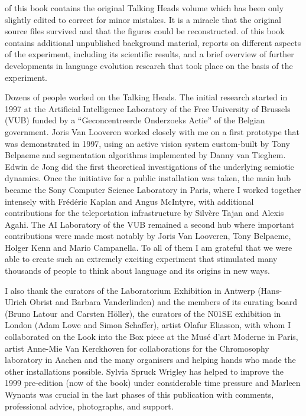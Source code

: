  of this book contains the original Talking Heads volume which has been only 
slightly edited to correct for minor mistakes. It is a miracle that the original source files survived and that the 
figures could be reconstructed.  of this book contains additional unpublished background 
material, reports on different aspects of the experiment, including its scientific results, and 
a brief overview of further developments in language evolution research that took place on the basis of the experiment. 

Dozens of people worked on the Talking Heads. The initial research started in 1997 at the Artificial Intelligence 
Laboratory of the Free University of Brussels (VUB) funded by a ``Geconcentreerde Onderzoeks Actie''
of the Belgian government. Joris Van Looveren worked closely with me on a first prototype 
that was demonstrated in 1997, using an active vision system custom-built by Tony Belpaeme and segmentation 
algorithms implemented by Danny van Tieghem. Edwin de Jong did the first theoretical investigations of the underlying 
semiotic dynamics. Once the initiative for a public installation was taken,  
the main hub became the Sony Computer Science Laboratory in Paris, 
where I worked together intensely with Fr\'{e}d\'{e}ric Kaplan and Angus McIntyre, with additional contributions for the 
teleportation infrastructure by Silv\`{e}re Tajan and Alexis Agahi. The AI Laboratory of the VUB remained
a second hub where important contributions were 
made most notably by Joris Van Looveren, Tony Belpaeme, Holger Kenn and Mario Campanella. To all of them I 
am grateful that we were able to create such an extremely exciting experiment that stimulated many 
thousands of people to think about language and its origins in new ways. 

I also thank the curators of the Laboratorium Exhibition in Antwerp (Hans-Ulrich Obrist and Barbara Vanderlinden) 
and the members of its curating board (Bruno Latour and Carsten H\"oller), the curators of the N01SE exhibition 
in London (Adam Lowe and Simon Schaffer), artist Olafur Eliasson, with whom I collaborated on the Look into the Box 
piece at the Mus\'e d'art Moderne in Paris, artist Anne-Mie Van Kerckhoven for collaborations for the Chromosophy 
laboratory in Aachen and the many organisers and helping hands who made the other installations possible. 
Sylvia Spruck Wrigley has helped to improve the 1999 pre-edition (now  of the book) 
under considerable time pressure and Marleen Wynants was crucial in the last phases of this publication with comments,
professional advice, photographs, and support. 

